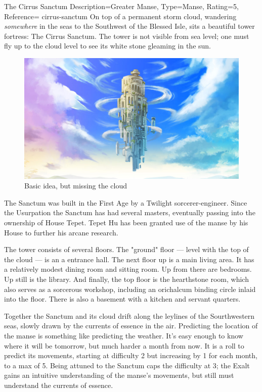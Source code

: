\begin{Merit}{The Cirrus Sanctum}{%
    Description=Greater Manse,
    Type=Manse,
    Rating=5,
    Reference=\cite*[p.~163]{ex3}
}{cirrus-sanctum}
    On top of a permanent storm cloud, wandering \emph{somewhere} in the seas
    to the Southwest of the Blessed Isle, sits a beautiful tower fortress: The
    Cirrus Sanctum. The tower is not visible from sea level; one must fly up
    to the cloud level to see its white stone gleaming in the sun.

    \begin{figure}[h]
        \includegraphics[width=\linewidth]{CirrusSanctum.jpg}
        \caption{Basic idea, but missing the cloud}
    \end{figure}

    The Sanctum was built in the First Age by a Twilight sorcerer-engineer.
    Since the Usurpation the Sanctum has had several masters, eventually
    passing into the ownership of House Tepet. Tepet Hu has been granted use of
    the manse by his House to further his arcane research.

    The tower consists of several floors. The "ground" floor --- level with the
    top of the cloud --- is an a entrance hall. The next floor up is a main
    living area. It has a relatively modest dining room and sitting room. Up
    from there are bedrooms. Up still is the library. And finally, the top
    floor is the hearthstone room, which also serves as a sorcerous workshop,
    including an orichalcum binding circle inlaid into the floor. There is also
    a basement with a kitchen and servant quarters.

    Together the Sanctum and its cloud drift along the leylines of the
    Sourthwestern seas, slowly drawn by the currents of essence in the air.
    Predicting the location of the manse is something like predicting the
    weather. It's easy enough to know where it will be tomorrow, but much
    harder a month from now. It is a  roll to predict its movements, starting at difficulty 2
    but increasing by 1 for each month, to a max of 5. Being attuned to the
    Sanctum caps the difficulty at 3; the Exalt gains an intuitive
    understanding of the manse's movements, but still must understand the
    currents of essence.



\end{Merit}
